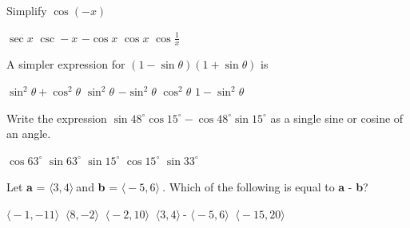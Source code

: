 \documentclass[../main.tex]{subfiles}
\begin{document}
\begin{questions}
    \begin{oneparchoices}
        \end{oneparchoices}  \answerline
    
    \question[1] Simplify $\cos(-x)$
    
    \begin{oneparchoices}
        \choice $\sec x$
        \choice $\csc -x$
        \choice $-\cos x$
        \choice $\cos x$
        \choice $\cos \frac{1}{x}$
        \end{oneparchoices}  \answerline
    
    \question[1] A simpler expression for $(1 - \sin \theta)(1 + \sin \theta)$ is
    
    \begin{oneparchoices}
        \choice $\sin^2 \theta + \cos^2 \theta$
        \choice $\sin^2\theta$
        \choice $-\sin^2\theta$
        \choice $\cos^2\theta$
        \choice $1 - \sin^2 \theta$
        \end{oneparchoices}  \answerline
    
    \question[1] Write the expression $\sin 48^\circ \cos 15^\circ - \cos 48^\circ \sin 15^\circ$ as a single sine or cosine of an angle. 
    
    \begin{oneparchoices}
        \choice $\cos 63^\circ$
        \choice $\sin 63^\circ$
        \choice $\sin 15^\circ$
        \choice $\cos 15^\circ$
        \choice $\sin 33^\circ$
        \end{oneparchoices}  \answerline
    
    \question[1] Let \textbf{a} = $\big \langle 3, 4 \big \rangle\ $and \textbf{b} = $\big \langle -5, 6 \big \rangle\ $. Which of the following is equal to \textbf{a} - \textbf{b}?
    
    \begin{oneparchoices}
        \choice $\big \langle -1, -11 \big \rangle\ $
        \choice $\big \langle 8, -2 \big \rangle\ $
        \choice $\big \langle -2, 10 \big \rangle\ $
        \choice $\big \langle 3, 4 \big \rangle\ $- $\big \langle -5, 6 \big \rangle\ $
        \choice $\big \langle -15, 20 \big \rangle\ $
        \end{oneparchoices}  \answerline
    

\end{questions}
\end{document}
